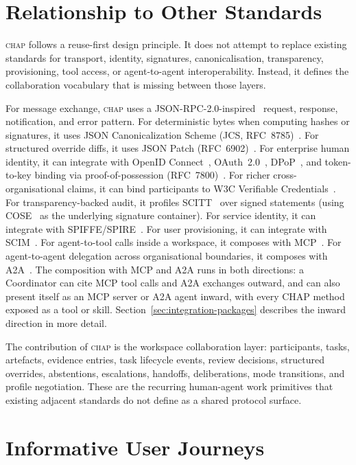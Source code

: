 \documentclass[11pt]{article}
\newcommand{\chap}{\textsc{chap}}
\begin{document}
\section{Relationship to Other Standards}
\label{sec:standards}

\chap{} follows a reuse-first design principle. It does not attempt to replace existing standards for transport, identity, signatures, canonicalisation, transparency, provisioning, tool access, or agent-to-agent interoperability. Instead, it defines the collaboration vocabulary that is missing between those layers.

For message exchange, \chap{} uses a JSON-RPC-2.0-inspired~\cite{jsonrpc} request, response, notification, and error pattern. For deterministic bytes when computing hashes or signatures, it uses JSON Canonicalization Scheme (JCS, RFC~8785)~\cite{jcs}. For structured override diffs, it uses JSON Patch (RFC~6902)~\cite{jsonpatch}. For enterprise human identity, it can integrate with OpenID Connect~\cite{oidc}, OAuth~2.0~\cite{oauth}, DPoP~\cite{dpop}, and token-to-key binding via proof-of-possession (RFC~7800)~\cite{rfc7800}. For richer cross-organisational claims, it can bind participants to W3C Verifiable Credentials~\cite{vc20}. For transparency-backed audit, it profiles SCITT~\cite{scitt} over signed statements (using COSE~\cite{cose} as the underlying signature container). For service identity, it can integrate with SPIFFE/SPIRE~\cite{spiffe}. For user provisioning, it can integrate with SCIM~\cite{scim}. For agent-to-tool calls inside a workspace, it composes with MCP~\cite{mcp}. For agent-to-agent delegation across organisational boundaries, it composes with A2A~\cite{a2a}. The composition with MCP and A2A runs in both directions: a Coordinator can cite MCP tool calls and A2A exchanges outward, and can also present itself as an MCP server or A2A agent inward, with every CHAP method exposed as a tool or skill. Section~\ref{sec:integration-packages} describes the inward direction in more detail.

The contribution of \chap{} is the workspace collaboration layer: participants, tasks, artefacts, evidence entries, task lifecycle events, review decisions, structured overrides, abstentions, escalations, handoffs, deliberations, mode transitions, and profile negotiation. These are the recurring human-agent work primitives that existing adjacent standards do not define as a shared protocol surface.

\section{Informative User Journeys}
\label{sec:user-journeys}
\end{document}
